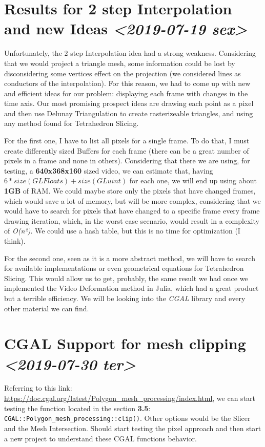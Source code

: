 \documentclass[11pt]{article}
\begin{document}
\section*{Results for 2 step Interpolation and new Ideas \textit{<2019-07-19 sex>}}
\label{sec:org9a39977}

Unfortunately, the 2 step Interpolation idea had a strong weakness. Considering that we would project a triangle mesh, some information could be lost by disconsidering some vertices effect on the projection (we considered lines as conductors of the interpolation). For this reason, we had to come up with new and efficient ideas for our problem: displaying each frame with changes in the time axis. Our most promising prospect ideas are drawing each point as a pixel and then use Delunay Triangulation to create rasterizeable triangles, and using any method found for Tetrahedron Slicing.

For the first one, I have to list all pixels for a single frame. To do that, I must create differently sized Buffers for each frame (there can be a great number of pixels in a frame and none in others). Considering that there we are using, for testing, a \textbf{640x368x160} sized video, we can estimate that, having \(6 * size(GLFloats) + size(GLuint)\) for each one, we will end up using about \textbf{1GB} of RAM. We could maybe store only the pixels that have changed frames, which would save a lot of memory, but will be more complex, considering that we would have to search for pixels that have changed to a specific frame every frame drawing iteration, which, in the worst case scenario, would result in a complexity of \emph{O(n²)}. We could use a hash table, but this is no time for optimization (I think).

For the second one, seen as it is a more abstract method, we will have to search for available implementations or even geometrical equations for Tetrahedron Slicing. This would allow us to get, probably, the same result we had once we implemented the Video Deformation method in Julia, which had a great product but a terrible efficiency. We will be looking into the \emph{CGAL} library and every other material we can find.   

\section*{CGAL Support for mesh clipping \textit{<2019-07-30 ter>}}
\label{sec:orgcd5cbf5}

Referring to this link: \url{https://doc.cgal.org/latest/Polygon\_mesh\_processing/index.html}, we can start testing the function located in the section \textbf{3.5}: \texttt{CGAL::Polygon\_mesh\_processing::clip()}. Other options would be the Slicer and the Mesh Intersection. Should start testing the pixel approach and then start a new project to understand these CGAL functions behavior.
\end{document}
